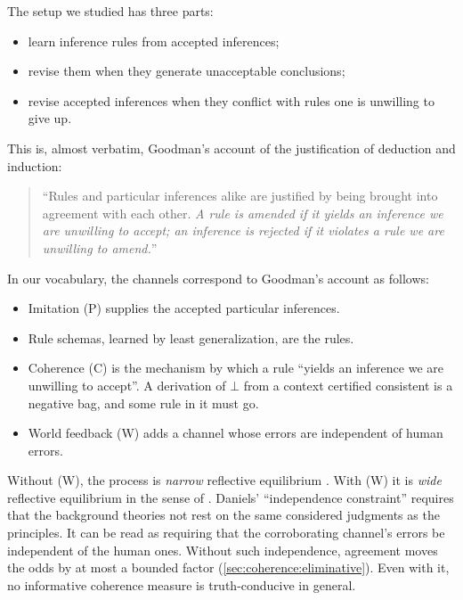 The setup we studied has three parts:
\begin{itemize}
\item learn inference rules from accepted inferences;
\item revise them when they generate unacceptable conclusions;
\item revise accepted inferences when they conflict with rules one is unwilling to give up.
\end{itemize}
This is, almost verbatim, Goodman's account of the justification of deduction and induction:
\begin{quote}
``Rules and particular inferences alike are justified by being brought into agreement with each other. \emph{A rule is amended if it yields an inference we are unwilling to accept; an inference is rejected if it violates a rule we are unwilling to amend.}'' \citep[ch.~III]{goodman1955fact}
\end{quote}
In our vocabulary, the channels correspond to Goodman's account as follows:
\begin{itemize}
\item Imitation (P) supplies the accepted particular inferences.
\item Rule schemas, learned by least generalization, are the rules.
\item Coherence (C) is the mechanism by which a rule ``yields an inference we are unwilling to accept''. A derivation of $\bot$ from a context certified consistent is a negative bag, and some rule in it must go.
\item World feedback (W) adds a channel whose errors are independent of human errors.
\end{itemize}
Without (W), the process is \emph{narrow} reflective equilibrium \citep{rawls1971theory,rawls1974independence}. With (W) it is \emph{wide} reflective equilibrium in the sense of \citet{daniels1979wide}. Daniels' ``independence constraint'' requires that the background theories not rest on the same considered judgments as the principles. It can be read as requiring that the corroborating channel's errors be independent of the human ones. Without such independence, agreement moves the odds by at most a bounded factor (\cref{sec:coherence:eliminative}). Even with it, no informative coherence measure is truth-conducive in general.

